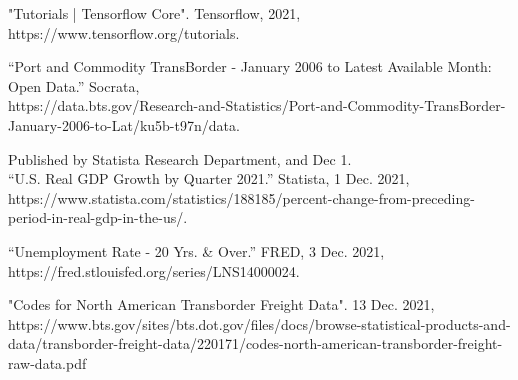 \documentclass[fontsize=11pt]{article}
\begin{document}
"Tutorials  |  Tensorflow Core". Tensorflow, 2021, https://www.tensorflow.org/tutorials.

“Port and Commodity TransBorder - January 2006 to Latest Available Month: Open Data.” Socrata,\\ https://data.bts.gov/Research-and-Statistics/Port-and-Commodity-TransBorder-January-2006-to-Lat/ku5b-t97n/data.

Published by Statista Research Department, and Dec 1.\\“U.S. Real GDP Growth by Quarter 2021.” Statista, 1 Dec. 2021,\\ https://www.statista.com/statistics/188185/percent-change-from-preceding-period-in-real-gdp-in-the-us/.

“Unemployment Rate - 20 Yrs. & Over.” FRED, 3 Dec. 2021, https://fred.stlouisfed.org/series/LNS14000024.

"Codes for North American Transborder Freight Data". 13 Dec. 2021, \\https://www.bts.gov/sites/bts.dot.gov/files/docs/browse-statistical-products-and-data/transborder-freight-data/220171/codes-north-american-transborder-freight-raw-data.pdf
\end{document}

